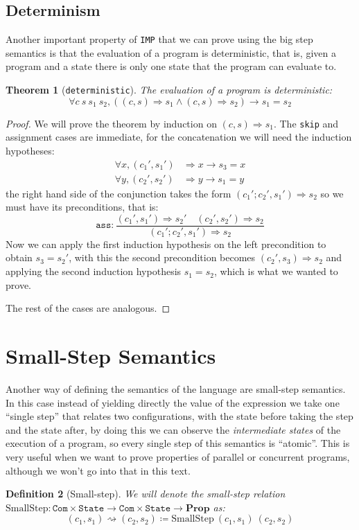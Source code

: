 \documentclass[
  a4paper, 
  10pt, 
  parskip=half, 
  DIV=20,
  toc=bibliography,
  usegeometry,
]{scrartcl}
\newtheorem{theorem}{Theorem}[section]
\newtheorem{definition}[theorem]{Definition}
\newcommand{\tyfont}[1]{\texttt{#1}}
\renewcommand{\implies}{\rightarrow}
\newcommand{\Prop}{\mathbf{Prop}}
\newcommand{\bigstep}{\Longrightarrow}
\begin{document}
\subsection{Determinism}

Another important property of \texttt{IMP} that we can prove using the big step
semantics is that the evaluation of a program is deterministic, that is, given
a program and a state there is only one state that the program can evaluate to.

\begin{theorem}[\texttt{deterministic}]\label{thm:deterministic}
  The evaluation of a program is deterministic:
  \[
  \forall c \ s \ s_1 \ s_2, ((c, s) \bigstep s_1 \land (c, s) \bigstep s_2) \implies s_1 = s_2
  \]
\end{theorem}

\begin{proof}
  We will prove the theorem by induction on \((c, s) \bigstep s_1\).
  The \texttt{skip} and assignment cases are immediate, for the concatenation
  we will need the induction hypotheses:
  \begin{align*}
    \forall x, (c_1', s_1') &\bigstep x \implies s_3 = x \\
    \forall y, (c_2', s_2') &\bigstep y \implies s_1 = y
  \end{align*}
  the right hand side of the conjunction takes the form 
  \((c_1';c_2', s_1') \bigstep s_2\) so we must have its preconditions,
  that is:
  \[
    \texttt{ass}: \frac{
      (c_1', s_1') \bigstep s_2' 
      \quad 
      (c_2', s_2') \bigstep s_2
    }{
      (c_1';c_2', s_1') \bigstep s_2
    }
  \]
  Now we can apply the first induction hypothesis on the left precondition to
  obtain \(s_3 = s_2'\), with this the second precondition becomes
  \((c_2', s_3) \bigstep s_2\) and applying the second 
  induction hypothesis \(s_1 = s_2\), which is what we wanted to prove.

  The rest of the cases are analogous.
\end{proof}

\section{Small-Step Semantics}

Another way of defining the semantics of the language are small-step semantics. 
In this case instead of yielding directly the value of the expression we take one \enquote{single step}
that relates two configurations, with the state before taking the step and the 
state after, by doing this we can observe
the \emph{intermediate states} of the execution of a program, so every single
step of this semantics is \enquote{atomic}. This is very useful when we want to
prove properties of parallel or concurrent programs, although we won't go into
that in this text.
\begin{definition}[Small-step]
  We will denote the small-step relation \(\text{SmallStep}: \tyfont{Com} \times \tyfont{State}
\to \tyfont{Com} \times \tyfont{State} \to \Prop\) as:
  \[
    (c_1, s_1) \rightsquigarrow (c_2, s_2) \coloneq \text{SmallStep} \ (c_1, s_1) \ (c_2, s_2)
  \]
\end{definition}
\end{document}
